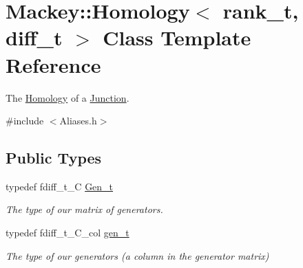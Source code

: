 \hypertarget{classMackey_1_1Homology}{}\section{Mackey\+:\+:Homology$<$ rank\+\_\+t, diff\+\_\+t $>$ Class Template Reference}
\label{classMackey_1_1Homology}


The \hyperlink{classMackey_1_1Homology}{Homology} of a \hyperlink{classMackey_1_1Junction}{Junction}.  




{\ttfamily \#include $<$Aliases.\+h$>$}

\subsection*{Public Types}
\begin{DoxyCompactItemize}
\item 
typedef fdiff\+\_\+t\+\_\+C \hyperlink{classMackey_1_1Homology_a9a8e354083ac094720820a5ff6bcff03}{Gen\+\_\+t}
\begin{DoxyCompactList}\small\item\em The type of our matrix of generators. \end{DoxyCompactList}\item 
typedef fdiff\+\_\+t\+\_\+\+C\+\_\+col \hyperlink{classMackey_1_1Homology_adf81f4293a5feba94aa734fcc8c89a46}{gen\+\_\+t}
\begin{DoxyCompactList}\small\item\em The type of our generators (a column in the generator matrix) \end{DoxyCompactList}\end{DoxyCompactItemize}

